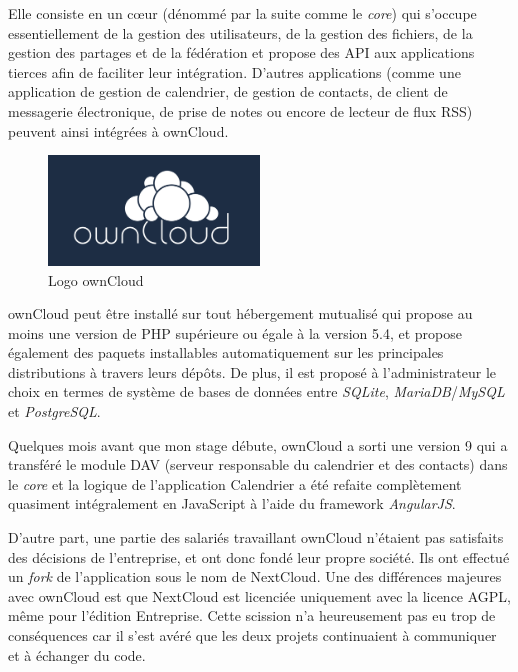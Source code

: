 \documentclass[10pt,a4paper]{report}
\begin{document}
	Elle consiste en un cœur (dénommé par la suite comme le \textit{core}) qui s'occupe essentiellement de la gestion des utilisateurs, de la gestion des fichiers, de la gestion des partages et de la fédération et propose des API aux applications tierces afin de faciliter leur intégration. D'autres applications (comme une application de gestion de calendrier, de gestion de contacts, de client de messagerie électronique, de prise de notes ou encore de lecteur de flux RSS) peuvent ainsi intégrées à ownCloud.
	
	\begin{figure}[ht]
		\centering
		\includegraphics[width=0.5\textwidth]{images/owncloud-logo.png}
		\caption*{Logo ownCloud}
		\label{normal_case}
	\end{figure}
	
	ownCloud peut être installé sur tout hébergement mutualisé qui propose au moins une version de PHP supérieure ou égale à la version 5.4, et propose également des paquets installables automatiquement sur les principales distributions à travers leurs dépôts. De plus, il est proposé à l'administrateur le choix en termes de système de bases de données entre \textit{SQLite}, \textit{MariaDB}/\textit{MySQL} et \textit{PostgreSQL}.
	
	Quelques mois avant que mon stage débute, ownCloud a sorti une version 9 qui a transféré le module DAV (serveur responsable du calendrier et des contacts) dans le \textit{core} et la logique de l'application Calendrier a été refaite complètement quasiment intégralement en JavaScript à l'aide du framework \textit{AngularJS}.
	
	D'autre part, une partie des salariés travaillant ownCloud n'étaient pas satisfaits des décisions de l'entreprise, et ont donc fondé leur propre société. Ils ont effectué un \textit{fork} de l'application sous le nom de NextCloud. Une des différences majeures avec ownCloud est que NextCloud est licenciée uniquement avec la licence AGPL, même pour l'édition Entreprise. Cette scission n'a heureusement pas eu trop de conséquences car il s'est avéré que les deux projets continuaient à communiquer et à échanger du code.
	
\end{document}

